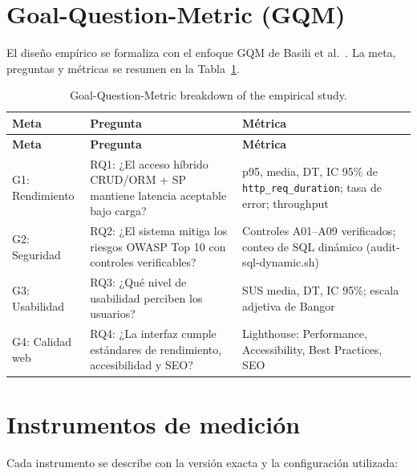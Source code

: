 \section{Goal-Question-Metric (GQM)}
\label{sec:gqm}

El diseño empírico se formaliza con el enfoque GQM de Basili et al.~\cite{basili1994}. La meta, preguntas y métricas se resumen en la Tabla~\ref{tab:gqm}.

\begin{longtable}{@{}p{3cm}p{4.5cm}p{5cm}@{}}
\caption{Goal-Question-Metric breakdown of the empirical study.}
\label{tab:gqm}\\
\toprule
\textbf{Meta} & \textbf{Pregunta} & \textbf{Métrica} \\
\midrule
\endfirsthead
\toprule
\textbf{Meta} & \textbf{Pregunta} & \textbf{Métrica} \\
\midrule
\endhead
G1: Rendimiento & RQ1: ¿El acceso híbrido CRUD/ORM + SP mantiene latencia aceptable bajo carga? & p95, media, DT, IC 95\% de \texttt{http\_req\_duration}; tasa de error; throughput \\
\midrule
G2: Seguridad & RQ2: ¿El sistema mitiga los riesgos OWASP Top 10 con controles verificables? & Controles A01--A09 verificados; conteo de SQL dinámico (audit-sql-dynamic.sh) \\
\midrule
G3: Usabilidad & RQ3: ¿Qué nivel de usabilidad perciben los usuarios? & SUS media, DT, IC 95\%; escala adjetiva de Bangor \\
\midrule
G4: Calidad web & RQ4: ¿La interfaz cumple estándares de rendimiento, accesibilidad y SEO? & Lighthouse: Performance, Accessibility, Best Practices, SEO \\
\bottomrule
\end{longtable}

\section{Instrumentos de medición}
\label{sec:instrumentos}

Cada instrumento se describe con la versión exacta y la configuración utilizada:

